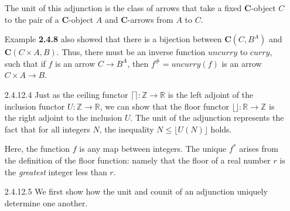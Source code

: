 \documentclass{article}
\newcommand{\ccat}{\mathbf{C}}
\newcommand{\dcat}{\mathbf{D}}
\newcommand{\ints}{\mathbb{Z}}
\newcommand{\reals}{\mathbb{R}}
\newcommand{\ceil}[1]{\lceil #1 \rceil}
\newcommand{\floor}[1]{\lfloor #1 \rfloor}
\begin{document}
\begin{enumerate}
\subitem
  The unit of this adjunction is the class of arrows that take a fixed $\ccat$-object $C$ to the pair of a $\ccat$-object $A$ and $\ccat$-arrows from $A$ to $C$.

\subitem
  Example \textbf{2.4.8} also showed that there is a bijection between $\ccat(C, B^A)$ and $\ccat(C \times A, B)$.
  Thus, there must be an inverse function $uncurry$ to $curry$, such that if $f$ is an arrow $C \rightarrow B^A$, then $f^\# = uncurry(f)$ is an arrow $C \times A \rightarrow B$.
  \begin{center}
  \end{center}

\vfill{}
\item[2.4.12.4]
  Just as the ceiling functor $\ceil{} : \ints \rightarrow \reals$ is the left adjoint of the inclusion functor $U : \ints \rightarrow \reals$, we can show that the floor functor $\floor{} : \reals \rightarrow \ints$ is the right adjoint to the inclusion $U$.
  The unit of the adjunction represents the fact that for all integers $N$, the inequality $N \le \floor{U(N)}$ holds.
  \begin{center}
  \end{center}
  Here, the function $f$ is any map between integers.
  The unique $f^*$ arises from the definition of the floor function: namely that the floor of a real number $r$ is the \emph{greatest} integer less than $r$.

\vfill{}
\newpage
\item[2.4.12.5]
  We first show how the unit and counit of an adjunction uniquely determine one another.


\end{enumerate}
\end{document}

